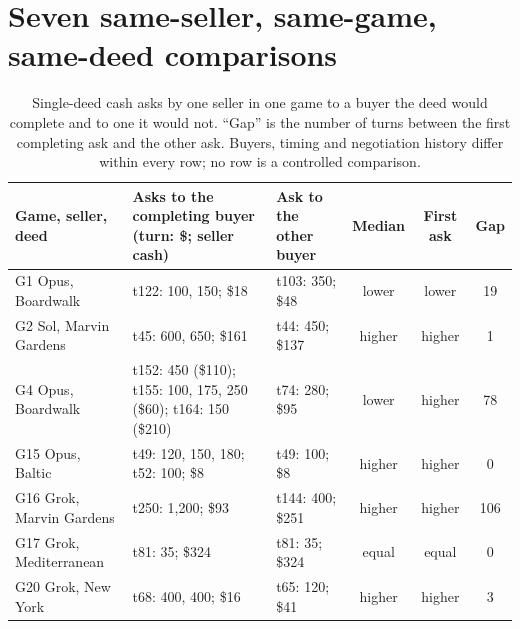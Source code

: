 \documentclass[11pt,letterpaper]{article}
\begin{document}
\section{Seven same-seller, same-game, same-deed comparisons}
\label{app:samedeed}
\begin{table}[h]
\centering\small
\begin{tabularx}{\linewidth}{@{}lXXccc@{}}
\toprule
Game, seller, deed & Asks to the completing buyer (turn: \$; seller cash) & Ask to the other buyer & Median & First ask & Gap\\
\midrule
G1 Opus, Boardwalk & t122: 100, 150; \$18 & t103: 350; \$48 & lower & lower & 19\\
G2 Sol, Marvin Gardens & t45: 600, 650; \$161 & t44: 450; \$137 & higher & higher & 1\\
G4 Opus, Boardwalk & t152: 450 (\$110); t155: 100, 175, 250 (\$60); t164: 150 (\$210) & t74: 280; \$95 & lower & higher & 78\\
G15 Opus, Baltic & t49: 120, 150, 180; t52: 100; \$8 & t49: 100; \$8 & higher & higher & 0\\
G16 Grok, Marvin Gardens & t250: 1,200; \$93 & t144: 400; \$251 & higher & higher & 106\\
G17 Grok, Mediterranean & t81: 35; \$324 & t81: 35; \$324 & equal & equal & 0\\
G20 Grok, New York & t68: 400, 400; \$16 & t65: 120; \$41 & higher & higher & 3\\
\bottomrule
\end{tabularx}
\caption{Single-deed cash asks by one seller in one game to a buyer the deed would complete and to one it would not. ``Gap'' is the number of turns between the first completing ask and the other ask. Buyers, timing and negotiation history differ within every row; no row is a controlled comparison.}
\end{table}
\end{document}
